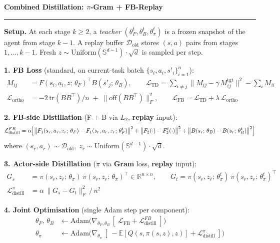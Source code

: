 \documentclass[11pt]{article}
\newcommand{\loss}{\mathcal{L}}
\newcommand{\R}{\mathbb{R}}
\begin{document}
\begin{center}
\textbf{\large Combined Distillation: $\pi$-Gram + FB-Replay}
\end{center}

\vspace{-0.3em}
\noindent\rule{\textwidth}{0.5pt}

\smallskip
\noindent\textbf{Setup.}\;
At each stage $k \geq 2$, a \emph{teacher} $(\theta_F^t, \theta_B^t, \theta_\pi^t)$ is a frozen snapshot of the agent from stage $k{-}1$.
A replay buffer $\mathcal{D}_{\text{old}}$ stores $(s,a)$ pairs from stages $1,\dots,k{-}1$.
Fresh $z \sim \mathrm{Uniform}(\mathbb{S}^{d-1}) \cdot \sqrt{d}$ is sampled per step.

\medskip
\noindent\textbf{1.\; FB Loss} (standard, on current-task batch $\{s_i, a_i, s'_i\}_{i=1}^n$):
\begin{align*}
M_{ij} &= F(s_i, a_i, z;\,\theta_F)^\top B(s'_j;\,\theta_B), \qquad
\loss_{\text{TD}} = \sum_{i \neq j} \bigl\| M_{ij} - \gamma\, M^{\text{tgt}}_{ij} \bigr\|^2 - \sum_i M_{ii}\\[4pt]
\loss_{\text{ortho}} &= -2\,\mathrm{tr}(BB^\top)/n \;+\; \bigl\| \mathrm{off}(BB^\top) \bigr\|^2_F, \qquad
\loss_{\text{FB}} = \loss_{\text{TD}} + \lambda\,\loss_{\text{ortho}}
\end{align*}

\medskip
\noindent\textbf{2.\; FB-side Distillation} (F + B via $L_2$, \textbf{replay} input):
\vspace{-0.2em}
\[
\loss_{\text{distill}}^{FB}
= \alpha \Bigl[
\bigl\| F_1(s_r, a_r, z_r;\,\theta_F) - F_1(s_r, a_r, z_r;\,\theta_F^t) \bigr\|^2
+ \bigl\| F_2(\cdot) - F_2^t(\cdot) \bigr\|^2
+ \bigl\| B(s_r;\,\theta_B) - B(s_r;\,\theta_B^t) \bigr\|^2
\Bigr]
\]
where $(s_r, a_r) \sim \mathcal{D}_{\text{old}},\; z_r \sim \mathrm{Uniform}(\mathbb{S}^{d-1})\cdot\sqrt{d}$.

\medskip
\noindent\textbf{3.\; Actor-side Distillation} ($\pi$ via \textbf{Gram} loss, \textbf{replay} input):
\vspace{-0.2em}
\begin{align*}
G_s &= \pi(s_r, z_r;\,\theta_\pi)\,\pi(s_r, z_r;\,\theta_\pi)^\top \in \R^{n \times n}, \qquad
G_t = \pi(s_r, z_r;\,\theta_\pi^t)\,\pi(s_r, z_r;\,\theta_\pi^t)^\top\\[4pt]
\loss_{\text{distill}}^{\pi} &= \alpha \,\bigl\| G_s - G_t \bigr\|^2_F \,/\, n^2
\end{align*}

\medskip
\noindent\textbf{4.\; Joint Optimisation} (single Adam step per component):
\vspace{-0.2em}
\begin{align*}
\theta_F,\,\theta_B &\leftarrow \textstyle \mathrm{Adam}\bigl(\nabla_{\theta_F,\theta_B}\,[\;\loss_{\text{FB}} + \loss_{\text{distill}}^{FB}\;]\bigr)\\[4pt]
\theta_\pi &\leftarrow \textstyle \mathrm{Adam}\bigl(\nabla_{\theta_\pi}\,[\;-\mathbb{E}[Q(s,\pi(s,z),z)] + \loss_{\text{distill}}^{\pi}\;]\bigr)
\end{align*}
\end{document}
